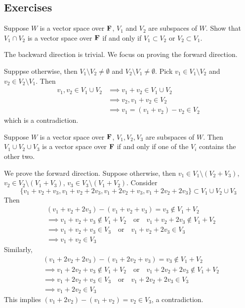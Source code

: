 \subsection*{Exercises}
\begin{prbm}
Suppose $W$ is a vector space over $\mathbf F$, $V_1$ and $V_2$ are subspaces of $W$. Show that $V_1\cap V_2$ is a vector space over $\mathbf F$ if and only if $V_1\subset V_2$ or $V_2\subset V_1$.
\end{prbm}

\begin{solution}
The backward direction is trivial. We focus on proving the forward direction.

Supppse otherwise, then $V_1\setminus V_2\neq\emptyset$ and $V_2\setminus V_1\neq\emptyset$. Pick $v_1\in V_1\setminus V_2$ and $v_2\in V_2\setminus V_1$. Then
\begin{align*}
v_1,v_2\in V_1\cup V_2&\implies v_1+v_2\in V_1\cup V_2\\
&\implies v_2,v_1+v_2\in V_2\\
&\implies v_1=(v_1+v_2)-v_2\in V_2
\end{align*}
which is a contradiction.
\end{solution}

\begin{prbm}
Suppose $W$ is a vector space over $\mathbf F$, $V_1,V_2,V_3$ are subspaces of $W$. Then $V_1\cup V_2\cup V_3$ is a vector space over $\mathbf F$ if and only if one of the $V_i$ contains the other two.
\end{prbm}

\begin{solution}
We prove the forward direction. Suppose otherwise, then $v_1\in V_1\setminus(V_2+V_3)$, $v_2\in V_2\setminus(V_1+V_3)$, $v_3\in V_3\setminus(V_1+V_2)$. Consider
\[\{v_1+v_2+v_3,v_1+v_2+2v_3,v_1+2v_2+v_3,v_1+2v_2+2v_3\}\subset V_1\cup V_2\cup V_3\]
Then
\begin{align*}
&(v_1+v_2+2v_3)-(v_1+v_2+v_3)=v_3\notin V_1+V_2\\
&\implies v_1+v_2+v_3\notin V_1+V_2\quad\text{or}\quad v_1+v_2+2v_3\notin V_1+V_2\\
&\implies v_1+v_2+v_3\in V_3\quad\text{or}\quad v_1+v_2+2v_3\in V_3\\
&\implies v_1+v_2\in V_3
\end{align*}
Similarly,
\begin{align*}
&(v_1+2v_2+2v_3)-(v_1+2v_2+v_3)=v_3\notin V_1+V_2\\
&\implies v_1+2v_2+v_3\notin V_1+V_2\quad\text{or}\quad v_1+2v_2+2v_3\notin V_1+V_2\\
&\implies v_1+2v_2+v_3\in V_3\quad\text{or}\quad v_1+2v_2+2v_3\in V_3\\
&\implies v_1+2v_2\in V_3
\end{align*}
This implies $(v_1+2v_2)-(v_1+v_2)=v_2\in V_3$, a contradiction.
\end{solution}